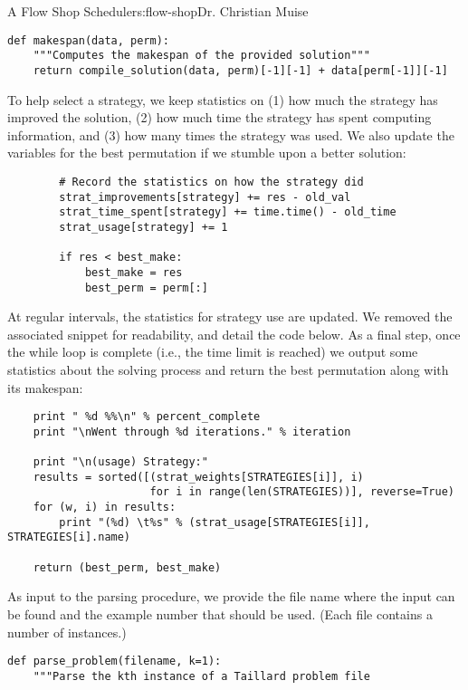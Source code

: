 \begin{aosachapter}{A Flow Shop Scheduler}{s:flow-shop}{Dr. Christian Muise}
\begin{verbatim}
def makespan(data, perm):
    """Computes the makespan of the provided solution"""
    return compile_solution(data, perm)[-1][-1] + data[perm[-1]][-1]
\end{verbatim}

To help select a strategy, we keep statistics on (1) how much the
strategy has improved the solution, (2) how much time the strategy has
spent computing information, and (3) how many times the strategy was
used. We also update the variables for the best permutation if we
stumble upon a better solution:

\begin{verbatim}
        # Record the statistics on how the strategy did
        strat_improvements[strategy] += res - old_val
        strat_time_spent[strategy] += time.time() - old_time
        strat_usage[strategy] += 1

        if res < best_make:
            best_make = res
            best_perm = perm[:]
\end{verbatim}

At regular intervals, the statistics for strategy use are updated. We
removed the associated snippet for readability, and detail the code
below. As a final step, once the while loop is complete (i.e., the time
limit is reached) we output some statistics about the solving process
and return the best permutation along with its makespan:

\begin{verbatim}
    print " %d %%\n" % percent_complete
    print "\nWent through %d iterations." % iteration

    print "\n(usage) Strategy:"
    results = sorted([(strat_weights[STRATEGIES[i]], i)
                      for i in range(len(STRATEGIES))], reverse=True)
    for (w, i) in results:
        print "(%d) \t%s" % (strat_usage[STRATEGIES[i]], STRATEGIES[i].name)

    return (best_perm, best_make)
\end{verbatim}

\label{parsing-problems}

As input to the parsing procedure, we provide the file name where the
input can be found and the example number that should be used. (Each
file contains a number of instances.)

\begin{verbatim}
def parse_problem(filename, k=1):
    """Parse the kth instance of a Taillard problem file


\end{verbatim}
\end{aosachapter}
